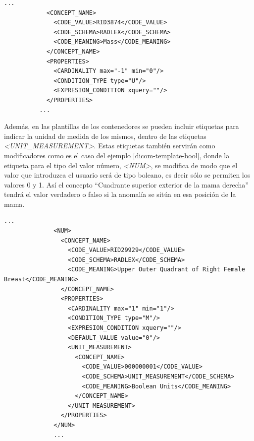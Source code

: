 \lstset{escapechar=@,style=dicom}
\renewcommand*\lstlistingname{Código}
\begin{lstlisting}[label=dicom-template-mass,caption=Fragmento de un plantilla informe estructurado: codificar una anomalía de tipo masa en una exploración de mama.]
		  ...
            <CONCEPT_NAME>
              <CODE_VALUE>RID3874</CODE_VALUE>
              <CODE_SCHEMA>RADLEX</CODE_SCHEMA>
              <CODE_MEANING>Mass</CODE_MEANING>
            </CONCEPT_NAME>
            <PROPERTIES>
              <CARDINALITY max="-1" min="0"/>
              <CONDITION_TYPE type="U"/>
              <EXPRESION_CONDITION xquery=""/>
            </PROPERTIES>
          ...
\end{lstlisting}

Además, en las plantillas de los contenedores se pueden incluir etiquetas para indicar la unidad de medida de los mismos, dentro de las etiquetas \emph{<UNIT\_MEASUREMENT>}. Estas etiquetas también servirán como modificadores como es el caso del ejemplo \ref{dicom-template-bool}, donde la etiqueta para el tipo del valor número, \textit{<NUM>}, se modifica de modo que el valor que introduzca el usuario será de tipo boleano, es decir sólo se permiten los valores 0 y 1. Así el concepto ``Cuadrante superior exterior de la mama derecha'' tendrá el valor verdadero o falso si la anomalía se sitúa en esa posición de la mama.\medskip\par

\lstset{escapechar=@,style=dicom}
\renewcommand*\lstlistingname{Código}
\begin{lstlisting}[label=dicom-template-bool,caption=Fragmento de una plantilla de un informe estructurado: codificar un atributo de tipo booleano.]
		  ...
              <NUM>
                <CONCEPT_NAME>
                  <CODE_VALUE>RID29929</CODE_VALUE>
                  <CODE_SCHEMA>RADLEX</CODE_SCHEMA>
                  <CODE_MEANING>Upper Outer Quadrant of Right Female Breast</CODE_MEANING>
                </CONCEPT_NAME>
                <PROPERTIES>
                  <CARDINALITY max="1" min="1"/>
                  <CONDITION_TYPE type="M"/>
                  <EXPRESION_CONDITION xquery=""/>
                  <DEFAULT_VALUE value="0"/>
                  <UNIT_MEASUREMENT>
                    <CONCEPT_NAME>
                      <CODE_VALUE>000000001</CODE_VALUE>
                      <CODE_SCHEMA>UNIT_MEASUREMENT</CODE_SCHEMA>
                      <CODE_MEANING>Boolean Units</CODE_MEANING>
                    </CONCEPT_NAME>
                  </UNIT_MEASUREMENT>
                </PROPERTIES>
              </NUM>
              ...
\end{lstlisting}

